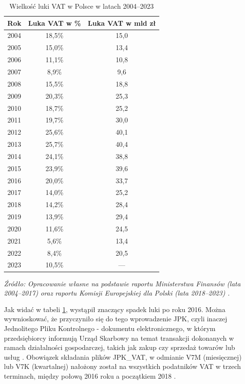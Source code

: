 \begin{table}[H]
    \centering
    \caption{Wielkość luki VAT w Polsce w latach 2004--2023}
    \label{tab:luka_vat_full}
    \renewcommand{\arraystretch}{1.2} 
    
    \begin{tabular}{ccc}
    \toprule
    \textbf{Rok} & \textbf{Luka VAT w \%} & \textbf{Luka VAT w mld zł} \\ 
    \midrule
    2004 & 18,5\% & 15,0 \\
    2005 & 15,0\% & 13,4 \\
    2006 & 11,1\% & 10,8 \\
    2007 & 8,9\%  & 9,6  \\
    2008 & 15,5\% & 18,8 \\
    2009 & 20,3\% & 25,3 \\
    2010 & 18,7\% & 25,2 \\
    2011 & 19,7\% & 30,0 \\
    2012 & 25,6\% & 40,1 \\
    2013 & 25,7\% & 40,4 \\
    2014 & 24,1\% & 38,8 \\
    2015 & 23,9\% & 39,6 \\
    2016 & 20,0\% & 33,7 \\
    2017 & 14,0\% & 25,2 \\
    
    \midrule[0.05pt] 
    2018 & 14,2\% & 28,4 \\
    2019 & 13,9\% & 29,4 \\
    2020 & 11,6\% & 24,5 \\
    2021 & 5,6\%  & 13,4 \\
    2022 & 8,4\%  & 20,5 \\
    2023 & 10,5\% & ---\\ 
    \bottomrule 
    \end{tabular}
    
    \vspace{0.2cm}
    \raggedright
    \footnotesize{
    \textit{Źródło: Opracowanie własne na podstawie raportu Ministerstwa Finansów (lata 2004--2017) \parencite{mf_raport_luka_2019} oraz raportu Komisji Europejskiej dla Polski (lata 2018--2023) \parencite{vat_gap_poland_2025}.}
    }
\end{table}

Jak widać w tabeli \ref{tab:luka_vat_full}, wystąpił znaczący spadek luki po roku 2016. Można wywnioskować, że przyczyniło się do tego wprowadzenie JPK, czyli inaczej Jednolitego Pliku Kontrolnego - dokumentu elektronicznego, w którym przedsiębiorcy informują Urząd Skarbowy na temat transakcji dokonanych w ramach działalności gospodarczej, takich jak zakup czy sprzedaż towarów lub usług \parencite{mf_jpk_informacje}. Obowiązek składania plików JPK\_VAT, w odmianie V7M (miesięcznej) lub V7K (kwartalnej) \parencite{zebrowska-fresenbet_jpk_2021} nałożony został na wszystkich podatników VAT w trzech terminach, między połową 2016 roku a początkiem 2018 \parencite{mf_jpk_informacje}.

